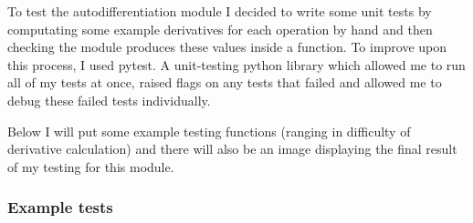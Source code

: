 \documentclass{article}
\begin{document}
    To test the autodifferentiation module I decided to write some unit tests by computating some example
    derivatives for each operation by hand and then checking the module produces these values inside a function.
    To improve upon this process, I used pytest. A unit-testing python library which allowed me to run all of my tests
    at once, raised flags on any tests that failed and allowed me to debug these failed tests individually.

    Below I will put some example testing functions (ranging in difficulty of derivative calculation) and there will
    also be an image displaying the final result of my testing for this module.

    \subsubsection{Example tests}
\end{document}
